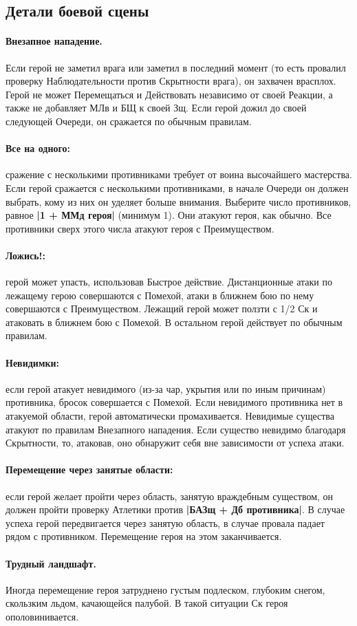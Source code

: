 \subsection{Детали боевой сцены}
\paragraph{Внезапное нападение.} Если герой не заметил врага или заметил в последний момент (то есть провалил проверку Наблюдательности против Скрытности врага), он захвачен врасплох. Герой не может Перемещаться и Действовать независимо от своей Реакции, а также не добавляет МЛв и БЩ к своей Зщ. Если герой дожил до своей следующей Очереди, он сражается по обычным правилам.
\paragraph{Все на одного:} сражение с несколькими противниками требует от воина высочайшего мастерства. Если герой сражается с несколькими противниками, в начале Очереди он должен выбрать, кому из них он уделяет больше внимания. Выберите число противников, равное \textbf{|1 + ММд героя|} (минимум 1). Они атакуют героя, как обычно. Все противники сверх этого числа атакуют героя с Преимуществом.
\paragraph{Ложись!:} герой может упасть, использовав Быстрое действие. Дистанционные атаки по лежащему герою совершаются с Помехой, атаки в ближнем бою по нему совершаются с Преимуществом. Лежащий герой может ползти с 1/2 Ск и атаковать в ближнем бою с Помехой. В остальном герой действует по обычным правилам.
\paragraph{Невидимки:} если герой атакует невидимого (из-за чар, укрытия или по иным причинам) противника, бросок совершается с Помехой. Если невидимого противника нет в атакуемой области, герой автоматически промахивается. Невидимые существа атакуют по правилам Внезапного нападения. Если существо невидимо благодаря Скрытности, то, атаковав, оно обнаружит себя вне зависимости от успеха атаки.
\paragraph{Перемещение через занятые области:} если герой желает пройти через область, занятую враждебным существом, он должен пройти проверку Атлетики против \textbf{|БАЗщ + Дб противника|}. В случае успеха герой передвигается через занятую область, в случае провала падает рядом с противником. Перемещение героя на этом заканчивается.
\paragraph{Трудный ландшафт.} Иногда перемещение героя затруднено густым подлеском, глубоким снегом, скользким льдом, качающейся палубой. В такой ситуации Ск героя ополовинивается.